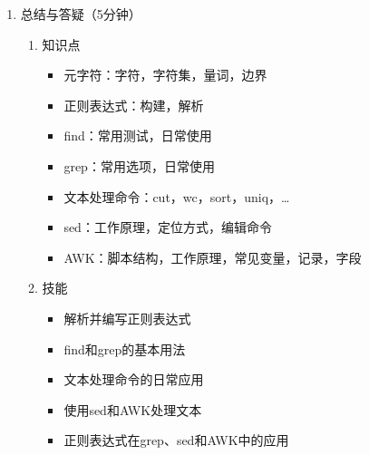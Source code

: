 \documentclass{TIJMUjiaoanLL}
\begin{document}
\begin{enumerate}
  \item 总结与答疑（5分钟）
    \begin{enumerate}
      \item 知识点
	\begin{itemize}
	  \item 元字符：字符，字符集，量词，边界
	  \item 正则表达式：构建，解析
	  \item find：常用测试，日常使用
	  \item grep：常用选项，日常使用
	  \item 文本处理命令：cut，wc，sort，uniq，\ldots
	  \item sed：工作原理，定位方式，编辑命令
	  \item AWK：脚本结构，工作原理，常见变量，记录，字段
	\end{itemize}
      \item 技能
	\begin{itemize}
          \item 解析并编写正则表达式
          \item find和grep的基本用法
          \item 文本处理命令的日常应用
          \item 使用sed和AWK处理文本
          \item 正则表达式在grep、sed和AWK中的应用
	\end{itemize}
    \end{enumerate}

\end{enumerate}

\otherTail
\end{document}
